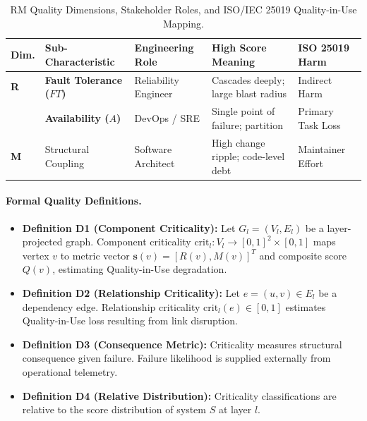 \begin{table}[htbp]
\centering
\small
\setlength{\tabcolsep}{4pt}
\caption{RM Quality Dimensions, Stakeholder Roles, and ISO/IEC 25019 Quality-in-Use Mapping.}
\label{tab:rm_stakeholders}
\begin{tabularx}{\textwidth}{l>{\raggedright\arraybackslash}p{2.6cm}>{\raggedright\arraybackslash}p{2.4cm}X>{\raggedright\arraybackslash}p{2.4cm}}
\toprule
\textbf{Dim.} & \textbf{Sub-Characteristic} & \textbf{Engineering Role} & \textbf{High Score Meaning} & \textbf{ISO 25019 Harm} \\
\midrule
\textbf{R} & \textbf{Fault Tolerance ($FT$)} & Reliability Engineer & Cascades deeply; large blast radius & Indirect Harm \\
& \textbf{Availability ($A$)} & DevOps / SRE & Single point of failure; partition & Primary Task Loss \\
\textbf{M} & Structural Coupling & Software Architect & High change ripple; code-level debt & Maintainer Effort \\
\bottomrule
\end{tabularx}
\end{table}

\paragraph{Formal Quality Definitions.}
\begin{itemize}
    \item \textbf{Definition D1 (Component Criticality):} Let $G_l = (V_l, E_l)$ be a layer-projected graph. Component criticality $\mathrm{crit}_l : V_l \to [0,1]^2 \times [0,1]$ maps vertex $v$ to metric vector $\mathbf{s}(v) = [R(v), M(v)]^T$ and composite score $Q(v)$, estimating Quality-in-Use degradation.
    \item \textbf{Definition D2 (Relationship Criticality):} Let $e = (u,v) \in E_l$ be a dependency edge. Relationship criticality $\mathrm{crit}_l(e) \in [0,1]$ estimates Quality-in-Use loss resulting from link disruption.
    \item \textbf{Definition D3 (Consequence Metric):} Criticality measures structural consequence given failure. Failure likelihood is supplied externally from operational telemetry.
    \item \textbf{Definition D4 (Relative Distribution):} Criticality classifications are relative to the score distribution of system $S$ at layer $l$.
\end{itemize}

